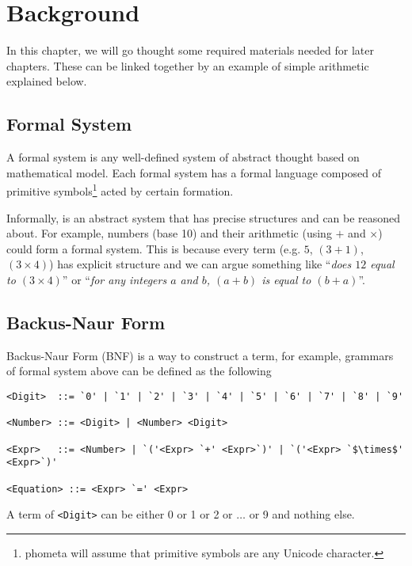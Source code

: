 \documentclass[master.tex]{subfiles}
\begin{document}
\chapter{Background}
\label{chap:background}

In this chapter, we will go thought some required materials needed for later
chapters. These can be linked together by an example of simple arithmetic
explained below.

\section{Formal System}

A formal system is any well-defined system of abstract thought based on
mathematical model\supercite{formal-system-wiki}. Each formal system has a
formal language composed of primitive symbols\footnote{phometa will assume that
  primitive symbols are any Unicode character.} acted by certain
formation\supercite{formal-system-britannica}.

Informally, is an abstract system that has precise structures and can be
reasoned about. For example, numbers (base 10) and their arithmetic (using $+$
and $\times$) could form a formal system. This is because every term (e.g. $5$,
$(3 + 1)$, $(3 \times 4)$) has explicit structure and we can argue something
like ``\emph{does $12$ equal to $(3 \times 4)$}'' or ``\emph{for any integers
  $a$ and $b$, $(a + b)$ is equal to $(b + a)$}''.

\section{Backus-Naur Form}

Backus-Naur Form (BNF) is a way to construct a term, for example, grammars of
formal system above can be defined as the following

\begin{lstlisting}[style=bnf]
<Digit>  ::= `0' | `1' | `2' | `3' | `4' | `5' | `6' | `7' | `8' | `9'

<Number> ::= <Digit> | <Number> <Digit>

<Expr>   ::= <Number> | `('<Expr> `+' <Expr>`)' | `('<Expr> `$\times$' <Expr>`)'

<Equation> ::= <Expr> `=' <Expr>
\end{lstlisting}

A term of \texttt{<Digit>} can be either 0 or 1 or 2 or $\ldots$ or 9 and nothing else.

\hspace{2ex}
\end{document}
